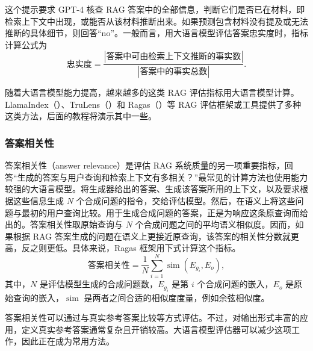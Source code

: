 这个提示要求 GPT-4 核查 RAG 答案中的全部信息，判断它们是否已在材料，即检索上下文中出现，或能否从该材料推断出来。如果预测包含材料没有提及或无法推断的具体细节，则回答“no”。一般而言，用大语言模型评估答案忠实度时，指标计算公式为
\begin{equation}
\text{忠实度}=
\frac{|\text{答案中可由检索上下文推断的事实数}|}
     {|\text{答案中的事实总数}|}.
\label{eq:ch07-faithfulness}
\end{equation}

随着大语言模型能力提高，越来越多的这类 RAG 评估指标用大语言模型计算。LlamaIndex（）、TruLens（）和 Ragas（）等 RAG 评估框架或工具提供了多种这类方法，后面的教程将演示其中一些。

\subsubsection{答案相关性}
答案相关性（answer relevance）是评估 RAG 系统质量的另一项重要指标，回答“生成的答案与用户查询和检索上下文有多相关？”最常见的计算方法也使用能力较强的大语言模型。将生成器给出的答案、生成该答案所用的上下文，以及要求根据这些信息生成 $N$ 个合成问题的指令，交给评估模型。然后，在语义上将这些问题与最初的用户查询比较。用于生成合成问题的答案，正是为响应这条原查询而给出的。答案相关性取原始查询与 $N$ 个合成问题之间的平均语义相似度。因而，如果根据 RAG 答案生成的问题在语义上更接近原查询，该答案的相关性分数就更高，反之则更低。具体来说，Ragas 框架用下式计算这个指标。
\begin{equation}
\text{答案相关性}=\frac{1}{N}\sum_{i=1}^{N}
  \operatorname{sim}(E_{g_i},E_o),
\label{eq:ch07-answer-relevance}
\end{equation}
其中，$N$ 是评估模型生成的合成问题数，$E_{g_i}$ 是第 $i$ 个合成问题的嵌入，$E_o$ 是原始查询的嵌入，$\operatorname{sim}$ 是两者之间合适的相似度度量，例如余弦相似度。

答案相关性可以通过与真实参考答案比较等方式评估。不过，对输出形式丰富的应用，定义真实参考答案通常复杂且开销较高。大语言模型评估器可以减少这项工作，因此正在成为常用方法。

